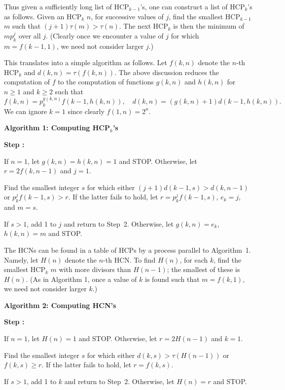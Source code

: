 \documentclass[12pt]{article}
\newenvironment{alg}[1]{\medskip \noindent \textbf{#1} \begin{list}%
{\textbf{Step \arabic{algctr}:}}%
{\usecounter{algctr} %
\parsep=0pt \itemsep=0pt \topsep=0pt}}{\end{list} \medskip}
\newcounter{algctr}
\begin{document}
Thus given a sufficiently long list of HCP$_{k-1}$'s, one can 
construct a list of HCP$_{k}$'s as follows. Given an HCP$_{k}$ $n$, 
for successive values of $j$, find the smallest HCP$_{k-1}$ $m$ such 
that $(j+1) \tau(m) > \tau(n)$. The next HCP$_{k}$ is then the 
minimum of $m p_{k}^{j}$ over all $j$. (Clearly once we encounter a 
value of $j$ for which $m = f(k-1,1)$, we need not consider larger 
$j$.)

This translates into a simple algorithm as follows. Let $f(k,n)$ 
denote the $n$-th HCP$_{k}$ and $d(k,n) = \tau(f(k,n))$. The above 
discussion reduces the computation of $f$ to the computation of 
functions $g(k,n)$ and $h(k, n)$ for $n \geq 1$ and $k \geq 2$ such that
\[
f(k, n) = p_{k}^{g(k,n)} f(k-1, h(k,n)), \quad
d(k, n) = (g(k,n) + 1) d(k-1, h(k,n)).
\]
We can ignore $k=1$ since clearly $f(1,n) = 2^{n}$.

\begin{alg}{Algorithm 1: Computing HCP$_k$'s}
\item
If $n = 1$, let $g(k, n) = h(k, n) = 1$ and STOP. 
Otherwise, let $r = 2 f(k, n-1)$ and $j = 1$.
\item
Find the smallest integer $s$ for which either
$(j+1)d(k-1, s) > d(k, n - 1)$ or $p_k^j f(k-1, s) > r$.
If the latter fails to hold,
let $r = p_k^j f(k-1, s)$, $e_k = j$, and $m = s$.
\item
If $s > 1$, add 1 to $j$ and return to Step~2. Otherwise,
let $g(k, n) = e_k$, $h(k, n) = m$ and STOP.
\end{alg}

The HCNs can be found in a table of HCPs 
by a process parallel to Algorithm~1. Namely, let $H(n)$ denote the 
$n$-th HCN. To find $H(n)$, for each $k$, 
find the smallest HCP$_{k}$ $m$ with more divisors than $H(n-1)$; the 
smallest of these is $H(n)$. (As in Algorithm 1, once a value of $k$ 
is found such that $m = f(k,1)$, we need not consider larger $k$.)

\begin{alg}{Algorithm 2: Computing HCN's}
\item
If $n = 1$, let $H(n) = 1$ and STOP.
Otherwise, let $r = 2 H(n-1)$ and $k=1$.
\item
Find the smallest integer $s$ for which either 
$d(k,s) > \tau(H(n-1))$ or $f(k,s) \geq r$. If the latter fails to 
hold, let $r = f(k, s)$.
\item
If $s > 1$, add 1 to $k$ and return to Step~2. Otherwise,
let $H(n) = r$ and STOP.
\end{alg}
\end{document}
